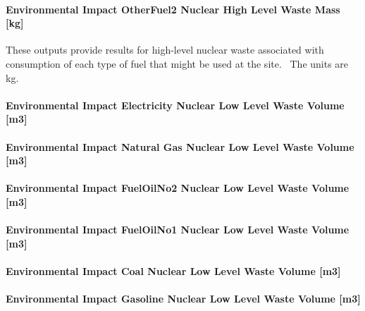 \paragraph{Environmental Impact OtherFuel2 Nuclear High Level Waste Mass {[}kg{]}}\label{environmental-impact-otherfuel2-nuclear-high-level-waste-mass-kg}

These outputs provide results for high-level nuclear waste associated with consumption of each type of fuel that might be used at the site.~ The units are kg.

\paragraph{Environmental Impact Electricity Nuclear Low Level Waste Volume {[}m3{]}}\label{environmental-impact-electricity-nuclear-low-level-waste-volume-m3}

\paragraph{Environmental Impact Natural Gas Nuclear Low Level Waste Volume {[}m3{]}}\label{environmental-impact-natural-gas-nuclear-low-level-waste-volume-m3}

\paragraph{Environmental Impact FuelOilNo2 Nuclear Low Level Waste Volume {[}m3{]}}\label{environmental-impact-fuel-oil-2-nuclear-low-level-waste-volume-m3}

\paragraph{Environmental Impact FuelOilNo1 Nuclear Low Level Waste Volume {[}m3{]}}\label{environmental-impact-fuel-oil-1-nuclear-low-level-waste-volume-m3}

\paragraph{Environmental Impact Coal Nuclear Low Level Waste Volume {[}m3{]}}\label{environmental-impact-coal-nuclear-low-level-waste-volume-m3}

\paragraph{Environmental Impact Gasoline Nuclear Low Level Waste Volume {[}m3{]}}\label{environmental-impact-gasoline-nuclear-low-level-waste-volume-m3}

